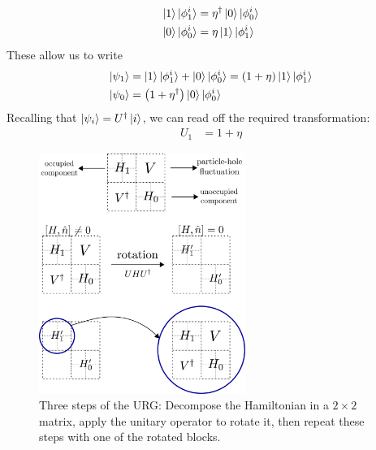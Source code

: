 \begin{equation}\begin{aligned}
    \ket{1}\ket{\phi_1^i} &= {\eta}^\dagger\ket{0}\ket{\phi_0^i}\\
    \ket{0}\ket{\phi_0^i} &= \eta\ket{1}\ket{\phi_1^i}
\end{aligned}\end{equation}
These allow us to write
\begin{equation}\begin{aligned}
	\label{trans}
	\ket{\psi_1} &= \ket{1}\ket{\phi_1^i} + \ket{0}\ket{\phi_0^i} = \left(1 + \eta\right)\ket{1}\ket{\phi_1^i}\\
	\ket{\psi_0} &= \left(1 + {\eta}^\dagger\right)\ket{0}\ket{\phi_0^i}
\end{aligned}\end{equation}
Recalling that \(\ket{\psi_i} = U^\dagger \ket{i}\), we can read off the required transformation:
\begin{equation}\begin{aligned}
	\label{Ui}
    U_1 &= 1 + \eta
\end{aligned}\end{equation}

\begin{figure}[!htb]
\begin{center}
	\includegraphics[width=0.6\textwidth]{../figures/URG_method.pdf}
\caption{Three steps of the URG: Decompose the Hamiltonian in a \(2\times 2\) matrix, apply the unitary operator to rotate it, then repeat these steps with one of the rotated blocks.}
\end{center}
\end{figure}


